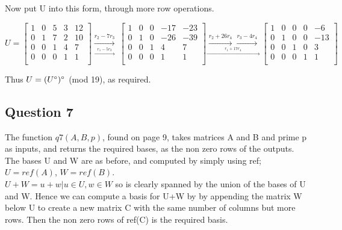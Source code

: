 \documentclass[10pt,a4paper]{report}
\begin{document}
\vspace{5mm}

Now put U into this form, through more row operations. 

\vspace{5mm}

\begin{equation*}
U=\begin{bmatrix}
1 & 0 & 5 & 3 & 12 \\
0 & 1 & 7 & 2 & 10\\
0 & 0 & 1 & 4 & 7\\
0 & 0 & 0 & 1 & 1\\
\end{bmatrix} \underset{\overset{r_1-5r_3}{\longrightarrow}}{\overset{r_2-7r_3}{\longrightarrow}}\
\begin{bmatrix}
1 & 0 & 0 & -17 & -23 \\
0 & 1 & 0 & -26 & -39\\
0 & 0 & 1 & 4 & 7\\
0 & 0 & 0 & 1 & 1\\
\end{bmatrix}\underset{\overset{r_1+17r_4}{\longrightarrow}}{\overset{r_2+26r_4}{\longrightarrow}{\overset{r_3-4r_4}{\longrightarrow}}}\
\begin{bmatrix}
1 & 0 & 0 & 0 & -6 \\
0 & 1 & 0 & 0 & -13\\
0 & 0 & 1 & 0 & 3\\
0 & 0 & 0 & 1 & 1\\
\end{bmatrix}
\end{equation*}

\vspace{5mm}

Thus $U=(U\degree)\degree$ (mod 19), as required.


\subsection*{Question 7}

The function $q7(A,B,p)$, found on page 9, takes matrices A and B and prime p as inputs, and returns the required bases, as the non zero rows of the outputs. The bases U and W are as before, and computed by simply using ref; $U=ref(A)$, $W=ref(B)$.\\

$U+W={u+w | u \in U, w \in W}$ so is clearly spanned by the union of the bases of U and W. Hence we can compute a basis for U+W by by appending the matrix W below U to create a new matrix C with the same number of columns but more rows. Then the non zero rows of ref(C) is the required basis. 
\end{document}
